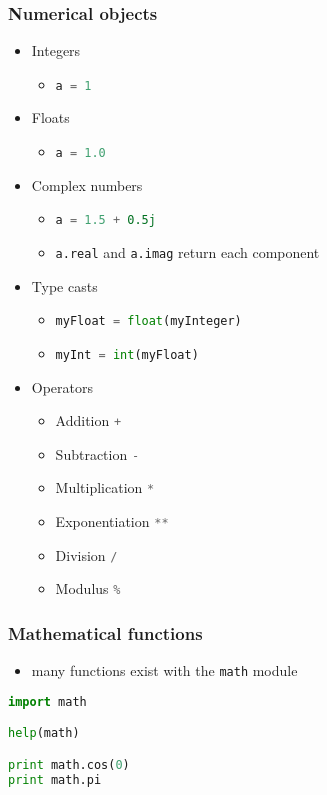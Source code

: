 \documentclass[xcolor=table,10pt,final]{beamer}
\begin{document}
\begin{frame}[fragile]
  \frametitle{Numerical objects}
  \begin{itemize}
    \item Integers
      \begin{itemize}
        \item \lstinline[language=Python]|a = 1|
      \end{itemize}
    \item Floats
      \begin{itemize}
        \item \lstinline[language=Python]|a = 1.0|
      \end{itemize}
    \item Complex numbers
      \begin{itemize}
        \item \lstinline[language=Python]|a = 1.5 + 0.5j|
        \item \lstinline[language=Python]|a.real| and \lstinline[language=Python]|a.imag| return each component
      \end{itemize}
    \item Type casts
      \begin{itemize}
        \item \lstinline[language=Python]|myFloat = float(myInteger)|
        \item \lstinline[language=Python]|myInt = int(myFloat)|
      \end{itemize}
    \item Operators
      \begin{itemize}
        \item Addition \lstinline[language=Python]|+|
        \item Subtraction \lstinline[language=Python]|-|
        \item Multiplication \lstinline[language=Python]|*|
        \item Exponentiation \lstinline[language=Python]|**|
        \item Division \lstinline[language=Python]|/|
        \item Modulus \lstinline[language=Python]|%|
      \end{itemize}
  \end{itemize}
\end{frame}

\begin{frame}[fragile]
  \frametitle{Mathematical functions}
  \begin{itemize}
    \item many functions exist with the {\tt math} module
  \end{itemize}
  \begin{lstlisting}[language=Python]
import math

help(math)

print math.cos(0)
print math.pi
\end{lstlisting}
\end{frame}
\end{document}
